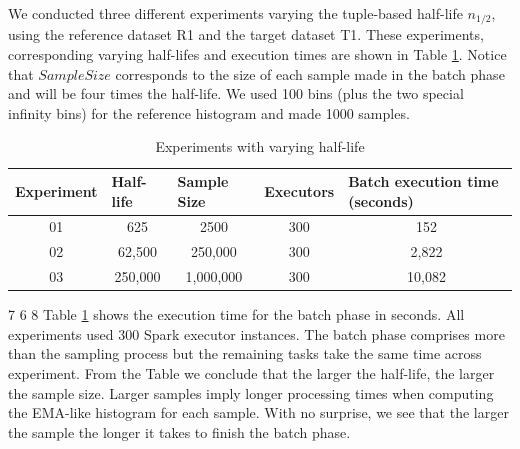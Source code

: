 We conducted three different experiments varying the tuple-based half-life $n_{1/2}$, using the reference dataset R1 and the target dataset T1. These experiments, corresponding varying half-lifes and execution times are shown in Table \ref{tbl:tests-half-life}. Notice that $Sample Size$ corresponds to the size of each sample made in the batch phase and will be four times the half-life. We used 100 bins (plus the two special infinity bins) for the reference histogram and made 1000 samples.
\begin{table}[!htb]
    \begin{center}
        \begin{tabular}{|c|c|c|c|c|}
        \hline
        \multicolumn{1}{|l|}{\textbf{Experiment}} & \multicolumn{1}{l|}{\textbf{Half-life}} & \multicolumn{1}{l|}{\textbf{Sample Size}} & \multicolumn{1}{l|}{\textbf{Executors}} & \multicolumn{1}{l|}{\textbf{Batch execution time (seconds)}} \\ \hline
        01                                        & 625                                     & 2500                                      & 300                                     & 152                                                          \\ \hline
        02                                        & 62,500                                  & 250,000                                   & 300                                     & 2,822                                                        \\ \hline
        03                                        & 250,000                                 & 1,000,000                                 & 300                                     & 10,082                                                       \\ \hline
        \end{tabular}
    \end{center}
    \caption{Experiments with varying half-life}
    \label{tbl:tests-half-life}
\end{table}
7 6 8
Table \ref{tbl:tests-half-life} shows the execution time for the batch phase in seconds. All experiments used 300 Spark executor instances. The batch phase comprises more than the sampling process but the remaining tasks take the same time across experiment. From the Table we conclude that the larger the half-life, the larger the sample size. Larger samples imply longer processing times when computing the EMA-like histogram for each sample. With no surprise, we see that the larger the sample the longer it takes to finish the batch phase.

